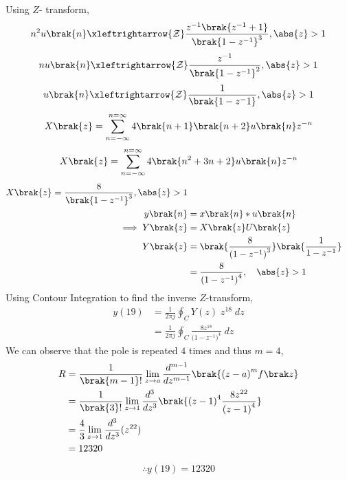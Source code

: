 \documentclass[journal,12pt,twocolumn]{IEEEtran}
\theoremstyle{remark}
\begin{document}
Using $Z$- transform,
\begin{align}
	n^2 u\brak{n}\xleftrightarrow{\mathcal{Z}} \frac{z^{-1}\brak{z^{-1}+1}}{\brak{1-z^{-1}}^3} ,  \abs{z} > 1
\end{align}
\begin{align}
	n u\brak{n}\xleftrightarrow{\mathcal{Z}} \frac{z^{-1}}{\brak{1-z^{-1}}^2} ,   \abs{z} >1 
\end{align}
\begin{align}
	u\brak{n}\xleftrightarrow{\mathcal{Z}} \frac{1}{\brak{1-z^-1}} ,   \abs{z} >1 
\end{align}
\begin{align}
    X\brak{z}=\sum_{n=-\infty}^{n=\infty}4\brak{n+1}\brak{n+2}u\brak{n}z^{-n}
\end{align}
\begin{align}
	X\brak{z}=\sum_{n=-\infty}^{n=\infty}4\brak{n^2+3n+2}u\brak{n}z^{-n}
\end{align}
\begin{align}
	X\brak{z}=\frac{8}{\brak{1-z^{-1}}^3} , \abs{z} >1\\
	y\brak{n}&=x\brak{n}\ast u\brak{n}\\
	\implies Y\brak{z}&=X\brak{z}U\brak{z}   \\
	 Y\brak{z}&=\brak{\frac{8}{({1-z^{-1})}^{3}}}\brak{\frac{1}{1-z^{-1}}}  \\
	 &=\frac{8}{({1-z^{-1})}^{4}} ,\quad \abs{z}>1
\end{align}
Using Contour Integration to find the inverse $Z$-transform,
\begin{align}
    y(19)&=\frac{1}{2\pi j}\oint_{C}Y(z) \;z^{18} \;dz  \\
    &=\frac{1}{2\pi j}\oint_{C}\frac{8z^{18}}{({1-z^{-1})}^{4}} \;dz 
\end{align}
We can observe that the pole is repeated $4$ times and thus $m=4$,
\begin{align}
    R&=\frac{1}{\brak {m-1}!}\lim\limits_{z\to a}\frac{d^{m-1}}{dz^{m-1}}\brak {{(z-a)}^{m}f\brak z}  \\
    &=\frac{1}{\brak {3}!}\lim\limits_{z\to 1}\frac{d^{3}}{dz^{3}}\brak {{(z-1)}^{4}\frac{8z^{22}}{{(z-1)}^4}}   \\
	&=\frac{4}{3}\lim\limits_{z\to 1}\frac{d^3}{dz^3}(z^{22})   \\
    &=12320
\end{align}
\begin{align}
    \therefore \boxed{y(19)=12320}
\end{align}
\end{document}
